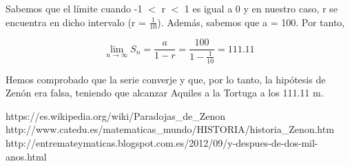 \documentclass[a4paper,12pt]{article}
\begin{document}
   Sabemos que el límite cuando -1 $<$ r $<$ 1 es igual a 0 y en nuestro caso, r se encuentra en
   dicho intervalo (r = $\frac{1}{10}$). Además, sabemos que a = 100. Por tanto, 
   
   \begin{equation}
   \lim\limits_{n \rightarrow \infty} S_n = \frac{a}{1 - r} = \frac{100}{1 - \frac{1}{10}} = 111.11
   \end{equation}
   
   Hemos comprobado que la serie converje y que, por lo tanto, la hipótesis de Zenón era falsa,
   teniendo que alcanzar Aquiles a la Tortuga a los 111.11 m.
      
   \newpage
   
   \begin{thebibliography}{99}
   
       https://es.wikipedia.org/wiki/Paradojas\_de\_Zenon
       http://www.catedu.es/matematicas\_mundo/HISTORIA/historia\_Zenon.htm
      http://entremateymaticas.blogspot.com.es/2012/09/y-despues-de-dos-mil-anos.html
      
      
   \end{thebibliography}
  
\end{document}
